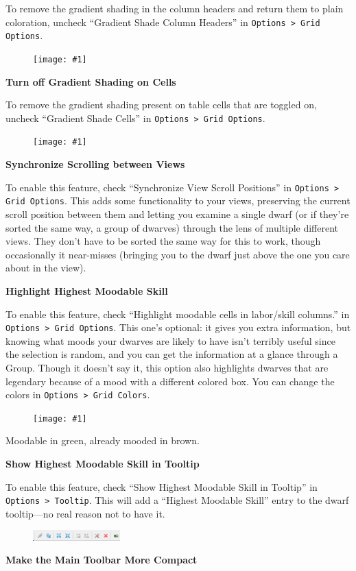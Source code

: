\documentclass[]{article}
\newcommand{\fullfigure}[1] {
\begin{figure}[h!]
\texttt{[image: \#1]}
\end{figure}
}
\newcommand{\fullfigurecaption}[1] {
\begin{center}
\vspace{-12pt}
#1
\end{center}
}
\begin{document}
To remove the gradient shading in the column headers and return them to plain coloration, uncheck
``Gradient Shade Column Headers'' in \texttt{Options > Grid Options}.

\fullfigure{Sec2Fig20}

\noindent \textbf{Turn off Gradient Shading on Cells}

To remove the gradient shading present on table cells that are toggled on, uncheck ``Gradient Shade Cells''
in \texttt{Options > Grid Options}.

\fullfigure{Sec2Fig21}

\noindent \textbf{Synchronize Scrolling between Views}

To enable this feature, check ``Synchronize View Scroll Positions'' in \texttt{Options > Grid Options}.
This adds some functionality to your views, preserving the current scroll position between them and
letting you examine a single dwarf (or if they're sorted the same way, a group of dwarves) through the
lens of multiple different views. They don't have to be sorted the same way for this to work, though
occasionally it near-misses (bringing you to the dwarf just above the one you care about in the view).
\vspace{12pt}

\noindent \textbf{Highlight Highest Moodable Skill}

To enable this feature, check ``Highlight moodable cells in labor/skill columns.'' in \texttt{Options >
Grid Options}. This one's optional: it gives you extra information, but knowing what moods your dwarves
are likely to have isn't terribly useful since the selection is random, and you can get the information
at a glance through a Group. Though it doesn't say it, this option also highlights dwarves that are
legendary because of a mood with a different colored box. You can change the colors in \texttt{Options >
Grid Colors}.

\fullfigure{Sec2Fig22}
\fullfigurecaption{Moodable in green, already mooded in brown.}

\noindent \textbf{Show Highest Moodable Skill in Tooltip}

To enable this feature, check ``Show Highest Moodable Skill in Tooltip'' in \texttt{Options > Tooltip}.
This will add a ``Highest Moodable Skill'' entry to the dwarf tooltip---no real reason not to have it.
\vspace{12pt}

\begin{figure}
\vspace{-5pt}
  \begin{center}
    \includegraphics[width=0.3\textwidth]{Sec2Fig23}
  \end{center}
\vspace{-10pt}
\end{figure}
\noindent \textbf{Make the Main Toolbar More Compact}
\end{document}
